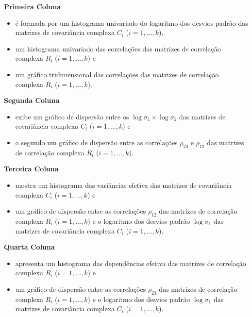 \documentclass[journal]{IEEEtran}
\begin{document}
\begin{flushleft} 
\textbf{Primeira Coluna}
\end{flushleft}

\begin{itemize}
\item é formada por um histograma univariado do logaritmo dos desvios padrão das matrizes de covariância complexa $C_{i}$ ($i=1,\ldots,k$),
\item um histograma univariado das correlações das matrizes de correlação complexa $R_{i}$ ($i=1,\ldots,k$) e
\item  um gráfico tridimensional das correlações das matrizes de correlação complexa $R_{i}$ ($i=1,\ldots,k$).
\end{itemize}

\begin{flushleft}
\textbf{Segunda Coluna} \label{estatisticas_utilizadas}
\end{flushleft}

\begin{itemize}
\item exibe um gráfico de dispersão entre os $\log\sigma_{1}\times \log\sigma_{2}$ das matrizes de covariância complexa $C_{i}$ ($i=1,\ldots,k$) e
\item o segundo um gráfico de dispersão entre as correlações $\rho_{23}$ e $\rho_{12}$ das matrizes de correlação complexa $R_{i}$ ($i=1,\ldots,k$).
\end{itemize}

\begin{flushleft}
\textbf{Terceira Coluna}
\end{flushleft}

\begin{itemize}
\item mostra um histograma das variâncias efetiva das matrizes de covariância complexa $C_{i}$ ($i=1,\ldots,k$) e
\item um gráfico de dispersão entre as correlações $\rho_{12}$ das matrizes de correlação complexa $R_{i}$ ($i=1,\ldots,k$) e o logaritmo dos desvios padrão $\log\sigma_{1}$ das matrizes de covariância complexa $C_{i}$ ($i=1,\ldots,k$).
\end{itemize}

\begin{flushleft}
\textbf{Quarta Coluna}
\end{flushleft}

\begin{itemize}
\item apresenta um histograma das dependências efetiva das matrizes de correlação complexa $R_{i}$ ($i=1,\ldots,k$) e
\item um gráfico de dispersão entre as correlações $\rho_{23}$ das matrizes de correlação complexa $R_{i}$ ($i=1,\ldots,k$) e o logaritmo dos desvios padrão $\log\sigma_{1}$ das matrizes de covariância complexa $C_{i}$ ($i=1,\ldots,k$).
\end{itemize}
\end{document}
